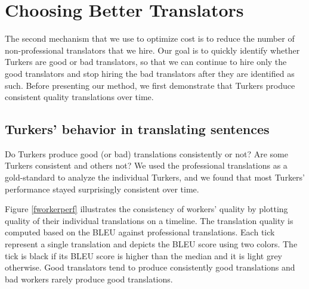 \documentclass[11pt,letterpaper]{article}
\begin{document}
\section{Choosing Better Translators}

The second mechanism that we use to optimize cost is to reduce the number of non-professional translators that we hire.  Our goal is to quickly identify whether Turkers are good or bad translators, so that we can continue to hire only the good translators and stop hiring the bad translators after they are identified as such. 
%
Before presenting our method, we first demonstrate that Turkers produce consistent quality translations over time.


\subsection{Turkers' behavior in translating sentences}

Do Turkers produce good (or bad) translations consistently or not? Are some Turkers  consistent and others not? We used the professional translations as a gold-standard to analyze the individual Turkers, and we found that most Turkers' performance stayed surprisingly consistent over time. 

Figure \ref{fworkerperf} illustrates the consistency of workers' quality by plotting quality of their individual translations on a timeline. The translation quality is computed based on the BLEU against professional translations. Each tick represent a single translation and depicts the BLEU score using two colors. The tick is black if its BLEU score is higher than the median and it is light grey otherwise. Good translators tend to produce consistently good translations and bad workers rarely produce good translations.
\end{document}
